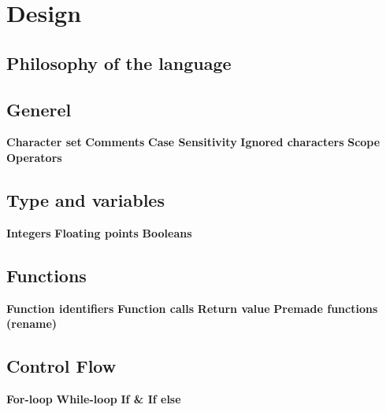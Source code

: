 \chapter{Design}
\label{cha:Design}
\section{Philosophy of the language}


\section{Generel}
\textbf{Character set}
\textbf{Comments}
\textbf{Case Sensitivity}
\textbf{Ignored characters}
\textbf{Scope}
\textbf{Operators}

\section{Type and variables}
\textbf{Integers}
\textbf{Floating points}
\textbf{Booleans}

\section{Functions}
\textbf{Function identifiers}
\textbf{Function calls}
\textbf{Return value}
\textbf{Premade functions (rename)}

\section{Control Flow}
\textbf{For-loop}
\textbf{While-loop}
\textbf{If \& If else}
